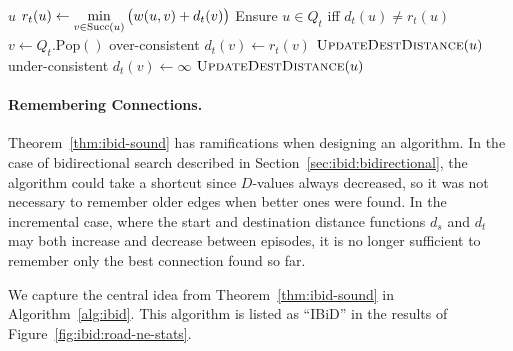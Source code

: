 {\begin{algorithm}[t]
\begin{minipage}[t]{8.2cm}
\begin{algorithmic}[1]
          {$u$}
               \State $r_t(u) \gets \displaystyle\min_{v \in \mbox{\scriptsize Succ}(u)}
                  \big( w(u,v) + d_t(v) \big)$
            \EndIf
            \State Ensure $u \in Q_t$ iff $d_t(u) \neq r_t(u)$
         \EndProcedure
          {\,\!}
            \State $v \gets Q_t.\mbox{Pop}()$
                  \Comment over-consistent
               \State $d_t(v) \gets r_t(v)$
                  \State $\mbox{\sc UpdateDestDistance}(u)$
               \EndFor
            \Else
                  \Comment under-consistent
               \State $d_t(v) \gets \infty$
                  \State $\mbox{\sc UpdateDestDistance}(u)$
               \EndFor
            \EndIf
         \EndProcedure
      \end{algorithmic}
   \end{minipage}
\end{algorithm}
} %

\paragraph{Remembering Connections.}
Theorem~\ref{thm:ibid-sound} has ramifications when designing
an algorithm.
In the case of bidirectional search
described in Section~\ref{sec:ibid:bidirectional},
the algorithm could take a shortcut since $D$-values always decreased,
so it was not necessary to remember older edges when better
ones were found.
In the incremental case,
where the start and destination distance functions $d_s$ and $d_t$
may both increase and decrease between episodes,
it is no longer sufficient to remember only the best connection
found so far.

We capture the central idea from Theorem~\ref{thm:ibid-sound}
in Algorithm~\ref{alg:ibid}.
This algorithm is listed as ``IBiD''
in the results of Figure~\ref{fig:ibid:road-ne-stats}.

